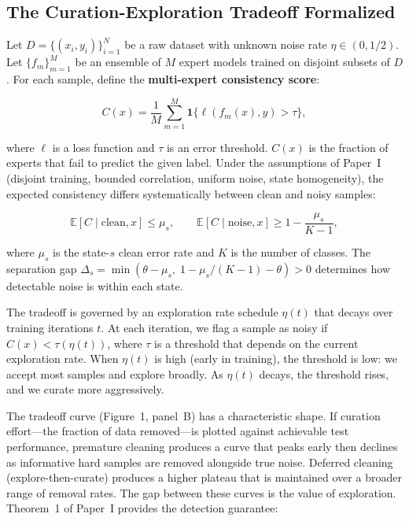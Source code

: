 \subsection{The Curation-Exploration Tradeoff Formalized}

Let $D = \{(x_i, y_i)\}_{i=1}^N$ be a raw dataset with unknown noise rate $\eta \in (0, 1/2)$. Let $\{f_m\}_{m=1}^M$ be an ensemble of $M$ expert models trained on disjoint subsets of $D$. For each sample, define the \textbf{multi-expert consistency score}:

\begin{equation}
C(x) = \frac{1}{M} \sum_{m=1}^M \mathbf{1}\bigl\{\ell(f_m(x), y) > \tau\bigr\},
\end{equation}

where $\ell$ is a loss function and $\tau$ is an error threshold. $C(x)$ is the fraction of experts that fail to predict the given label. Under the assumptions of Paper~I (disjoint training, bounded correlation, uniform noise, state homogeneity), the expected consistency differs systematically between clean and noisy samples:

\begin{equation}
\mathbb{E}[C \mid \text{clean}, x] \leq \mu_s, \qquad
\mathbb{E}[C \mid \text{noise}, x] \geq 1 - \frac{\mu_s}{K-1},
\end{equation}

where $\mu_s$ is the state-$s$ clean error rate and $K$ is the number of classes. The separation gap $\Delta_s = \min(\theta - \mu_s,\; 1 - \mu_s/(K-1) - \theta) > 0$ determines how detectable noise is within each state.

The tradeoff is governed by an exploration rate schedule $\eta(t)$ that decays over training iterations $t$. At each iteration, we flag a sample as noisy if $C(x) < \tau(\eta(t))$, where $\tau$ is a threshold that depends on the current exploration rate. When $\eta(t)$ is high (early in training), the threshold is low: we accept most samples and explore broadly. As $\eta(t)$ decays, the threshold rises, and we curate more aggressively.

The tradeoff curve (Figure~1, panel~B) has a characteristic shape. If curation effort---the fraction of data removed---is plotted against achievable test performance, premature cleaning produces a curve that peaks early then declines as informative hard samples are removed alongside true noise. Deferred cleaning (explore-then-curate) produces a higher plateau that is maintained over a broader range of removal rates. The gap between these curves is the value of exploration. Theorem~1 of Paper~I provides the detection guarantee:

